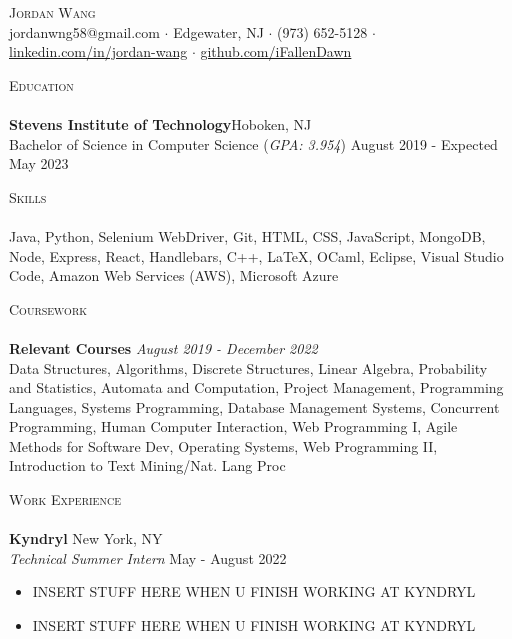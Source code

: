 \documentclass[10pt]{article}
\newcommand{\lineunder} {
    \vspace*{-8pt} \\
    \hspace*{-18pt} \hrulefill \\
}
\newcommand{\header} [1] {
    {\hspace*{-18pt}\vspace*{6pt} \textsc{#1}}
    \vspace*{-6pt} \lineunder
}
\begin{document}
\vspace*{-40pt}

    

\vspace*{2pt}
\begin{center}
	{\Huge \scshape {Jordan Wang}}\\
	\vspace{2mm}
	jordanwng58@gmail.com $\cdot$ Edgewater, NJ $\cdot$ (973) 652-5128 $\cdot$ \href{https://www.linkedin.com/in/jordan-wang/}{linkedin.com/in/jordan-wang} $\cdot$ \href{https://github.com/iFallenDawn}{github.com/iFallenDawn} \\
\end{center}
\header{Education}
\textbf{Stevens Institute of Technology}\hfill Hoboken, NJ\\
Bachelor of Science in Computer Science (\textit{GPA: 3.954}) \hfill August 2019 - Expected May 2023\\
\vspace{2mm}

\header{Skills}
	Java, Python, Selenium WebDriver, Git, HTML, CSS, JavaScript, MongoDB, Node, Express, React, Handlebars, C++, \LaTeX, OCaml, Eclipse, Visual Studio Code, Amazon Web Services (AWS), Microsoft Azure                    \\
\vspace{2mm}

\header{Coursework}
{\textbf{Relevant Courses}} {\sl August 2019 - December 2022} \hfill 
\\
Data Structures, Algorithms, Discrete Structures, Linear Algebra, Probability and Statistics, Automata and Computation, Project Management, Programming Languages, Systems Programming, Database Management Systems, Concurrent Programming, Human Computer Interaction, Web Programming I, Agile Methods for Software Dev, Operating Systems, Web Programming II, Introduction to Text Mining/Nat. Lang Proc\\
\vspace{2mm}

\header{Work Experience}
\textbf{Kyndryl} \hfill New York, NY\\
\textit{Technical Summer Intern} \hfill May - August 2022\\
\vspace{-1mm}
\begin{itemize}[noitemsep,parsep=0pt,partopsep=0pt]\itemsep 1pt
    \item INSERT STUFF HERE WHEN U FINISH WORKING AT KYNDRYL
    \item INSERT STUFF HERE WHEN U FINISH WORKING AT KYNDRYL
\end{itemize}
\end{document}
